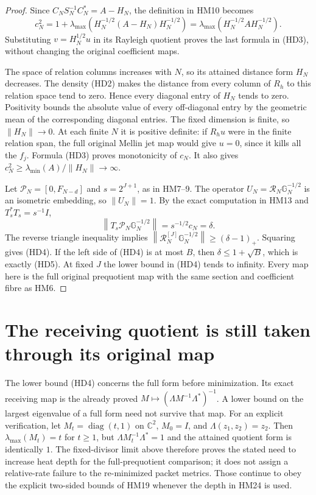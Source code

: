 \documentclass[11pt]{article}
\newcommand{\C}{\mathbb C}\newcommand{\R}{\mathbb R}
\newcommand{\norm}[1]{\left\lVert#1\right\rVert}
\begin{document}
\begin{proof}
Since $C_NS_N^{-1}C_N^*=A-H_N$, the definition in HM10 becomes
\[
 c_N^2=1+\lambda_{\max}
       (H_N^{-1/2}(A-H_N)H_N^{-1/2})
       =\lambda_{\max}(H_N^{-1/2}AH_N^{-1/2}).
\]
Substituting $v=H_N^{1/2}u$ in its Rayleigh quotient proves the last
formula in (HD3), without changing the original coefficient maps.

The space of relation columns increases with $N$, so its attained
distance form $H_N$ decreases. The density (HD2) makes the distance
from every column of $R_h$ to this relation space tend to zero.
Hence every diagonal entry of $H_N$ tends to zero. Positivity bounds
the absolute value of every off-diagonal entry by the geometric mean
of the corresponding diagonal entries. The fixed dimension is finite,
so $\norm{H_N}\to0$. At each finite $N$ it is positive definite:
if $R_hu$ were in the finite relation span, the full original Mellin
jet map would give $u=0$, since it kills all the $f_j$.
Formula (HD3) proves monotonicity of $c_N$. It also gives
$c_N^2\ge\lambda_{\min}(A)/\norm{H_N}\to\infty$.

Let $\mathcal P_N=[0,F_{N-d}]$ and $s=2^{J+1}$, as in HM7--9.
The operator $U_N=\mathcal R_N\mathbb G_N^{-1/2}$ is an isometric
embedding, so $\norm{U_N}=1$. By the exact computation in HM13 and
$T_s^*T_s=s^{-1}I$,
\[
 \norm{T_s\mathcal P_N\mathbb G_N^{-1/2}}=s^{-1/2}c_N=\delta.
\]
The reverse triangle inequality implies
$\norm{\mathcal R_N^{[J]}\mathbb G_N^{-1/2}}\ge(\delta-1)_+$.
Squaring gives (HD4). If the left side of (HD4) is at most $B$,
then $\delta\le1+\sqrt B$, which is exactly (HD5). At fixed $J$
the lower bound in (HD4) tends to infinity. Every map here is the
full original prequotient map with the same section and coefficient
fibre as HM6.
\end{proof}

\section{The receiving quotient is still taken through its original map}
The lower bound (HD4) concerns the full form before minimization.
Its exact receiving map is the already proved
$M\mapsto(\Lambda M^{-1}\Lambda^*)^{-1}$. A lower bound on the
largest eigenvalue of a full form need not survive that map. For an
explicit verification, let $M_t=\operatorname{diag}(t,1)$ on $\C^2$,
$M_0=I$, and $\Lambda(z_1,z_2)=z_2$. Then
$\lambda_{\max}(M_t)=t$ for $t\ge1$, but
$\Lambda M_t^{-1}\Lambda^*=1$ and the attained quotient form is
identically $1$. The fixed-divisor limit above therefore proves the
stated need to increase heat depth for the full-prequotient comparison;
it does not assign a relative-rate failure to the re-minimized packet
metrics. Those continue to obey the explicit two-sided bounds of
HM19 whenever the depth in HM24 is used.
\end{document}
